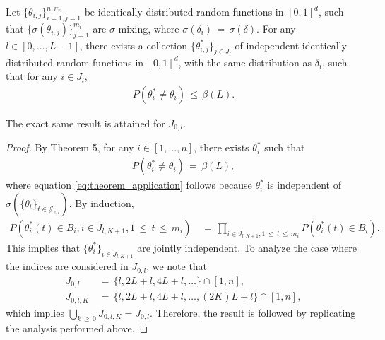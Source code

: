 \documentclass[twoside,11pt]{article}
\begin{document}
\begin{lemma}
\label{Lemma 11.} Let \(\{\theta_{i,j}\}_{i=1,j=1}^{n,m_i}\) be identically distributed random functions in \([0,1]^d\), such that \(\{\sigma(\theta_{i,j})\}_{j=1}^{m_i}\) are \(\sigma\)-mixing, where \(\sigma(\delta_i) \,=\, \sigma(\delta)\). For any \(l \in [0, \ldots, L-1]\), there exists a collection \(\{\theta_{i,j}^*\}_{j \in J_{l}}\) of independent identically distributed random functions in \([0,1]^d\), with the same distribution as \(\delta_i\), such that for any \(i \in J_{l}\),
\begin{align}
    P(\theta_{i}^* \neq \theta_i) \,\leq\, \beta(L). \label{eq:independence_lemma}
\end{align}

The exact same result is attained for \(J_{0,l}\).
\end{lemma}
\begin{proof} By Theorem 5, for any \(i \in [1, \ldots, n]\), there exists \(\theta_{i}^*\) such that
\begin{align}
    P(\theta_{i}^* \neq \theta_i) \,=\, \beta(L), \label{eq:theorem_application}
\end{align}
where equation \eqref{eq:theorem_application} follows because \(\theta_{i}^*\) is independent of \(\sigma(\{\theta_{t}\}_{t \in \mathcal{J}_{e,l}})\). By induction,
\begin{align}
    P(\theta_{i}^*(t) \in B_{i}, i \in J_{l,K+1}, 1 \,\leq\, t \,\leq\, m_i) &\,=\, \prod_{i \in J_{l,K+1}, 1 \,\leq\, t \,\leq\, m_i} P(\theta_{i}^*(t) \in B_{i}). \label{eq:independence_joint}
\end{align}
This implies that \(\{\theta_{i}^*\}_{i\in J_{l,K+1}}\) are jointly independent. To analyze the case where the indices are considered in \(J_{0,l}\), we note that
\begin{align}
    J_{0,l} &\,=\, \{l, 2L + l, 4L + l, \ldots\} \cap [1,n], \\
    J_{0,l,K} &\,=\, \{l, 2L + l, 4L + l, \ldots, (2K)L + l\} \cap [1,n],
\end{align}
which implies \(\bigcup_{k \,\geq\, 0} J_{0,l,K} = J_{0,l}\). Therefore, the result is followed by replicating the analysis performed above. 
\end{proof}






\vskip 0.2in

\end{document}
